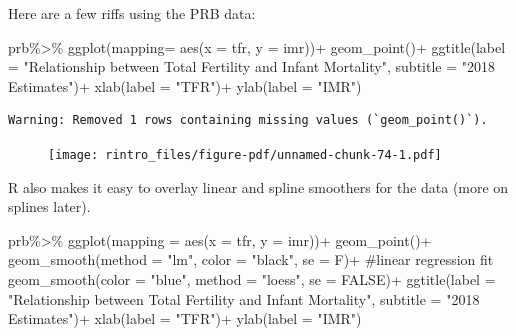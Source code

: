 \documentclass[
  letterpaper,
  DIV=11,
  numbers=noendperiod]{scrreprt}
\newenvironment{Shaded}{\begin{snugshade}}{\end{snugshade}}
\newcommand{\AttributeTok}[1]{\textcolor[rgb]{0.40,0.45,0.13}{#1}}
\newcommand{\CommentTok}[1]{\textcolor[rgb]{0.37,0.37,0.37}{#1}}
\newcommand{\ConstantTok}[1]{\textcolor[rgb]{0.56,0.35,0.01}{#1}}
\newcommand{\FunctionTok}[1]{\textcolor[rgb]{0.28,0.35,0.67}{#1}}
\newcommand{\NormalTok}[1]{\textcolor[rgb]{0.00,0.23,0.31}{#1}}
\newcommand{\SpecialCharTok}[1]{\textcolor[rgb]{0.37,0.37,0.37}{#1}}
\newcommand{\StringTok}[1]{\textcolor[rgb]{0.13,0.47,0.30}{#1}}
\begin{document}
Here are a few riffs using the PRB data:

\begin{Shaded}
\begin{Highlighting}[]
\NormalTok{prb}\SpecialCharTok{\%\textgreater{}\%}
\FunctionTok{ggplot}\NormalTok{(}\AttributeTok{mapping=} \FunctionTok{aes}\NormalTok{(}\AttributeTok{x =}\NormalTok{ tfr,}
                    \AttributeTok{y =}\NormalTok{ imr))}\SpecialCharTok{+}
  \FunctionTok{geom\_point}\NormalTok{()}\SpecialCharTok{+}
  \FunctionTok{ggtitle}\NormalTok{(}\AttributeTok{label =} \StringTok{"Relationship between Total Fertility and Infant Mortality"}\NormalTok{,}
          \AttributeTok{subtitle =} \StringTok{"2018 Estimates"}\NormalTok{)}\SpecialCharTok{+}
  \FunctionTok{xlab}\NormalTok{(}\AttributeTok{label =} \StringTok{"TFR"}\NormalTok{)}\SpecialCharTok{+}
  \FunctionTok{ylab}\NormalTok{(}\AttributeTok{label =} \StringTok{"IMR"}\NormalTok{)}
\end{Highlighting}
\end{Shaded}

\begin{verbatim}
Warning: Removed 1 rows containing missing values (`geom_point()`).
\end{verbatim}

\begin{figure}[H]

{\centering \texttt{[image: rintro\_files/figure-pdf/unnamed-chunk-74-1.pdf]}

}

\end{figure}

R also makes it easy to overlay linear and spline smoothers for the data
(more on splines later).

\begin{Shaded}
\begin{Highlighting}[]
\NormalTok{prb}\SpecialCharTok{\%\textgreater{}\%}
\FunctionTok{ggplot}\NormalTok{(}\AttributeTok{mapping =} \FunctionTok{aes}\NormalTok{(}\AttributeTok{x =}\NormalTok{ tfr,}
                    \AttributeTok{y =}\NormalTok{ imr))}\SpecialCharTok{+}
  \FunctionTok{geom\_point}\NormalTok{()}\SpecialCharTok{+}
  \FunctionTok{geom\_smooth}\NormalTok{(}\AttributeTok{method =} \StringTok{"lm"}\NormalTok{,}
              \AttributeTok{color =} \StringTok{"black"}\NormalTok{,}
              \AttributeTok{se =}\NormalTok{ F)}\SpecialCharTok{+} \CommentTok{\#linear regression fit}
  \FunctionTok{geom\_smooth}\NormalTok{(}\AttributeTok{color =} \StringTok{"blue"}\NormalTok{,}
              \AttributeTok{method =} \StringTok{"loess"}\NormalTok{,}
              \AttributeTok{se =} \ConstantTok{FALSE}\NormalTok{)}\SpecialCharTok{+}
  \FunctionTok{ggtitle}\NormalTok{(}\AttributeTok{label =} \StringTok{"Relationship between Total Fertility and Infant Mortality"}\NormalTok{,}
          \AttributeTok{subtitle =} \StringTok{"2018 Estimates"}\NormalTok{)}\SpecialCharTok{+}
  \FunctionTok{xlab}\NormalTok{(}\AttributeTok{label =} \StringTok{"TFR"}\NormalTok{)}\SpecialCharTok{+}
  \FunctionTok{ylab}\NormalTok{(}\AttributeTok{label =} \StringTok{"IMR"}\NormalTok{)}
\end{Highlighting}
\end{Shaded}
\end{document}
